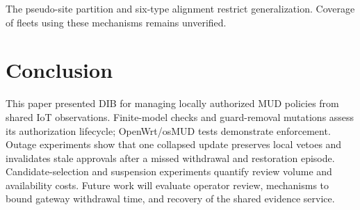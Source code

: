 \documentclass[journal]{IEEEtran}
\theoremstyle{definition}
\begin{document}
The pseudo-site partition and six-type alignment restrict generalization. Coverage of fleets using these mechanisms remains unverified.


\section{Conclusion}
\label{sec:conclusion}
This paper presented DIB for managing locally authorized MUD policies from shared IoT observations. Finite-model checks and guard-removal mutations assess its authorization lifecycle; OpenWrt/osMUD tests demonstrate enforcement. Outage experiments show that one collapsed update preserves local vetoes and invalidates stale approvals after a missed withdrawal and restoration episode. Candidate-selection and suspension experiments quantify review volume and availability costs. Future work will evaluate operator review, mechanisms to bound gateway withdrawal time, and recovery of the shared evidence service.
\end{document}
